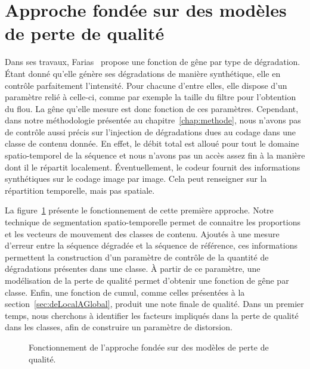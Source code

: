 \section{Approche fondée sur des modèles de perte de qualité}
Dans ses travaux, Farias~\cite{farias-phd} propose une fonction de gêne par type de dégradation. Étant donné qu'elle génère ses dégradations de manière synthétique, elle en contrôle parfaitement l'intensité. Pour chacune d'entre elles, elle dispose d'un paramètre relié à celle-ci, comme par exemple la taille du filtre pour l'obtention du flou. La gêne qu'elle mesure est donc fonction de ces paramètres. Cependant, dans notre méthodologie présentée au chapitre~\ref{chap:methode}, nous n'avons pas de contrôle aussi précis sur l'injection de dégradations dues au codage \avc{} dans une classe de contenu donnée. En effet, le débit total est alloué pour tout le domaine spatio-temporel de la séquence et nous n'avons pas un accès assez fin à la manière dont il le répartit localement. Éventuellement, le codeur fournit des informations synthétiques sur le codage image par image. Cela peut renseigner sur la répartition temporelle, mais pas spatiale.

La figure~\ref{fig:chap7Approche1} présente le fonctionnement de cette première approche. Notre technique de segmentation spatio-temporelle permet de connaitre les proportions et les vecteurs de mouvement des classes de contenu. Ajoutés à une mesure d'erreur entre la séquence dégradée et la séquence de référence, ces informations permettent la construction d'un paramètre de contrôle de la quantité de dégradations présentes dans une classe. À partir de ce paramètre, une modélisation de la perte de qualité permet d'obtenir une fonction de gêne par classe. Enfin, une fonction de cumul, comme celles présentées à la section~\ref{sec:deLocalAGlobal}, produit une note finale de qualité. Dans un premier temps, nous cherchons à identifier les facteurs impliqués dans la perte de qualité dans les classes, afin de construire un paramètre de distorsion. %

\begin{figure}[htbp]
	\centering
	\begin{tikzpicture}[text centered, node distance=2cm]\end{tikzpicture}
	\label{fig:chap7Approche1}
	\caption{Fonctionnement de l'approche fondée sur des modèles de perte de qualité.}
\end{figure}


